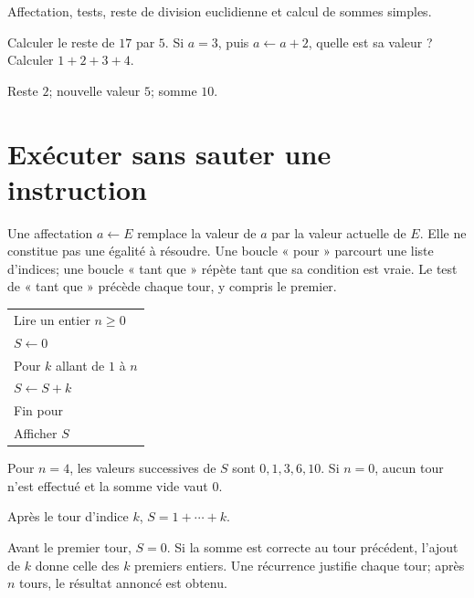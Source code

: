 \label{t11s-c07}
\begin{revision}Affectation, tests, reste de division euclidienne et calcul de sommes simples.\end{revision}
\begin{automatismes}\exo\label{t11s-c07-auto}Calculer le reste de $17$ par $5$. Si $a=3$, puis $a\leftarrow a+2$, quelle est sa valeur ? Calculer $1+2+3+4$.\end{automatismes}
\begin{corrige}\label{sol-t11s-c07-auto}Reste $2$; nouvelle valeur $5$; somme $10$.\end{corrige}

\section{Exécuter sans sauter une instruction}
\begin{definition}Une affectation $a\leftarrow E$ remplace la valeur de $a$ par la valeur actuelle de $E$. Elle ne constitue pas une égalité à résoudre. Une boucle « pour » parcourt une liste d’indices; une boucle « tant que » répète tant que sa condition est vraie. Le test de « tant que » précède chaque tour, y compris le premier.\end{definition}
\begin{exemple}
\begin{tabular}{l}
Lire un entier $n\ge0$\\
$S\leftarrow0$\\
Pour $k$ allant de $1$ à $n$\\
\quad $S\leftarrow S+k$\\
Fin pour\\
Afficher $S$
\end{tabular}
Pour $n=4$, les valeurs successives de $S$ sont $0,1,3,6,10$. Si $n=0$, aucun tour n’est effectué et la somme vide vaut $0$.
\end{exemple}
\begin{propriete}Après le tour d’indice $k$, $S=1+\cdots+k$.\end{propriete}
\begin{demonstration}Avant le premier tour, $S=0$. Si la somme est correcte au tour précédent, l’ajout de $k$ donne celle des $k$ premiers entiers. Une récurrence justifie chaque tour; après $n$ tours, le résultat annoncé est obtenu.\end{demonstration}
